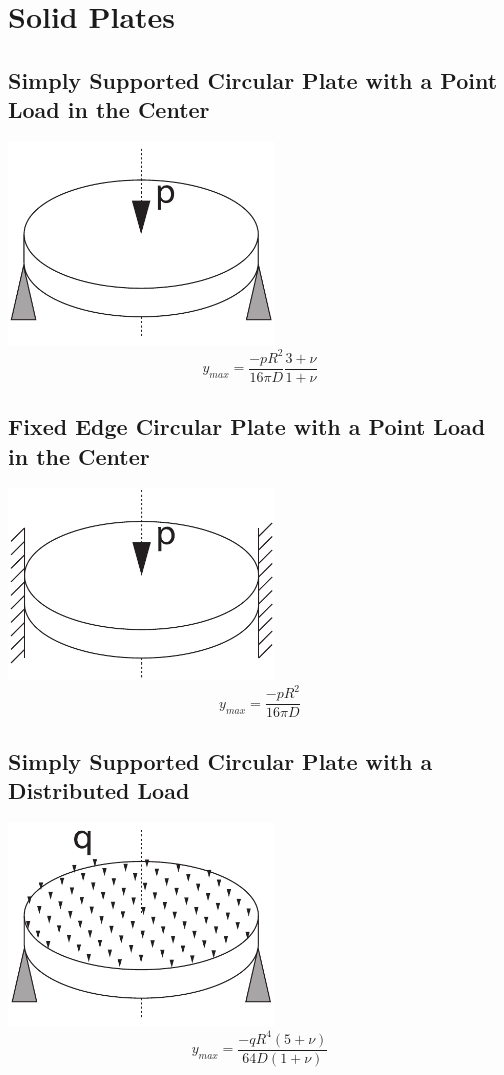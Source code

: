\documentclass[10pt,letterpaper]{report}
\numberwithin{equation}{chapter}
\begin{document}
\section{Solid Plates}
\subsection{Simply Supported Circular Plate with a Point Load in the Center}
\includegraphics[width=200pt]{3D_pinned_point_NoHole.pdf}
\[y_{max} = \frac{-p R^2}{16 \pi D} \frac{3 + \nu}{1 + \nu}\]
\subsection{Fixed Edge Circular Plate with a Point Load in the Center}
\includegraphics[width=200pt]{3D_fixed_point_NoHole.pdf}
\[y_{max} = \frac{-p R^2}{16 \pi D}\]
\subsection{Simply Supported Circular Plate with a Distributed Load}
\includegraphics[width=200pt]{3D_pinned_pressure_NoHole.pdf}
\[y_{max} = \frac{-q R^4 (5+ \nu)}{64D(1+\nu)}\]
\end{document}
